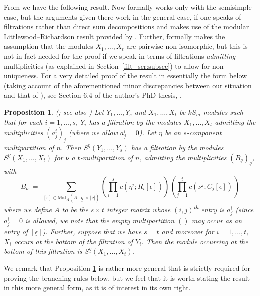 \documentclass[10pt]{article}
\newtheorem{prop}[theorem]{Proposition}
\theoremstyle{definition}
\newcommand{\tss}[1]{\textsuperscript{#1}}
\newcommand{\ul}[1]{\underline{#1}}
\begin{document}
From \cite{CHTAN} we have the following result. Now \cite{CHTAN} formally works only with the semisimple case, but the arguments given
there work in the general case, if one speaks of filtrations rather than direct sum decompositions and makes use of the  modular
Littlewood--Richardson result provided by \cite{JAMPEEL}. Further, \cite{CHTAN} formally makes the assumption that the modules
$X_1,\ldots,X_t$ are pairwise non-isomorphic, but this is not in fact needed for the proof if we speak in terms of filtrations
\textit{admitting} multiplicities (as explained in Section~\ref{filt_ser:subsec}) to allow for non-uniqueness. For a very detailed proof
of the result in essentially the form below (taking account of the aforementioned minor discrepancies between our situation and that of
\cite{CHTAN}), see Section 6.4 of the author's PhD thesis, \cite{PHDTHES}.

\begin{prop}\label{S_eta_Y_filt_S_nu_X:prop}\textup{(}\cite[Lemma 4.4, (1)]{CHTAN}; see also \cite[Proposition 6.4.1]{PHDTHES}\textup{)}
Let $Y_1,\ldots,Y_s$ and $X_1,\ldots,X_t$ be $kS_m$-modules such that for each $i=1,\ldots,s$, $Y_i$ has a filtration by the modules
$X_1,\ldots,X_t$ admitting the multiplicities $(a^i_j)_j$ (where we allow $a^i_j=0$). Let $\ul{\eta}$ be an $s$-component
multipartition of $n$. Then $S^{\ul{\eta}}(Y_1,\ldots,Y_s)$ has a filtration by the modules $S^{\ul{\nu}}(X_1,\ldots,X_t)$ for $\ul{\nu}$ a
$t$-multipartition of $n$, admitting the multiplicities $\left(B_{\ul{\nu}}\right)_{\ul{\nu}}$, with
\[
B_{\ul{\nu}} \;=\; \sum_{[\ul{\epsilon}] \in \mathrm{Mat}_{\ul{\Lambda}}(A;|\ul{\eta}|\times|\ul{\nu}|)}
\!\!\left(\prod^s_{i=1}c(\eta^i;R_i[\ul{\epsilon}])\right)\!\!\!\left(\prod^t_{j=1}c(\nu^j;C_j[\ul{\epsilon}])\right)
\]
where we define $A$ to be the $s \times t$ integer matrix whose $(i,j)$\tss{th} entry is $a^i_j$ (since $a^i_j=0$ is allowed, we note
that the empty multipartition $()$ may occur as an entry of $[\ul{\epsilon}]$). Further, suppose that we have $s = t$
and moreover for $i=1,\ldots,t$, $X_i$ occurs at the bottom of the filtration of $Y_i$. Then the module occurring at the bottom of this
filtration is $S^{\ul{\eta}}(X_1,\ldots,X_t)$.
\end{prop}

We remark that Proposition \ref{S_eta_Y_filt_S_nu_X:prop} is rather more general that is strictly required for proving the branching
rules below, but we feel that it is worth stating the result in this more general form, as it is of interest in its own right.
\end{document}
